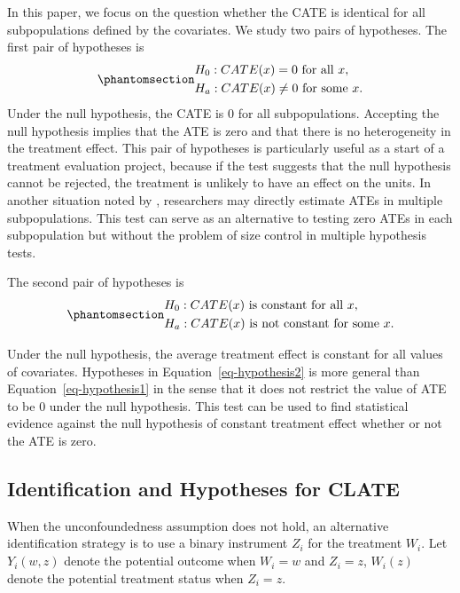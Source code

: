 \documentclass[
  12pt,
  12pt]{article}
\numberwithin{equation}{section}
\theoremstyle{definition}
\theoremstyle{plain}
\theoremstyle{plain}
\theoremstyle{remark}
\begin{document}
In this paper, we focus on the question whether the CATE is identical
for all subpopulations defined by the covariates. We study two pairs of
hypotheses. The first pair of hypotheses is
\begin{equation}\phantomsection\label{eq-hypothesis1}{
\begin{aligned}
& H_0: CATE(x) = 0 \ \text{for all} \ x, \\
& H_a: CATE(x) \neq 0 \ \text{for some} \ x.
\end{aligned}
}\end{equation} Under the null hypothesis, the CATE is 0 for all
subpopulations. Accepting the null hypothesis implies that the ATE is
zero and that there is no heterogeneity in the treatment effect. This
pair of hypotheses is particularly useful as a start of a treatment
evaluation project, because if the test suggests that the null
hypothesis cannot be rejected, the treatment is unlikely to have an
effect on the units. In another situation noted by
\citet{crump2008nonparametric}, researchers may directly estimate ATEs
in multiple subpopulations. This test can serve as an alternative to
testing zero ATEs in each subpopulation but without the problem of size
control in multiple hypothesis tests.

The second pair of hypotheses is
\begin{equation}\phantomsection\label{eq-hypothesis2}{
\begin{aligned}
& H_0: CATE(x) \ \text{is constant for all} \ x,  \\
& H_a: CATE(x) \ \text{is not constant for some} \ x.
\end{aligned}
}\end{equation}

Under the null hypothesis, the average treatment effect is constant for
all values of covariates. Hypotheses in Equation~\ref{eq-hypothesis2} is
more general than Equation~\ref{eq-hypothesis1} in the sense that it
does not restrict the value of ATE to be \(0\) under the null
hypothesis. This test can be used to find statistical evidence against
the null hypothesis of constant treatment effect whether or not the ATE
is zero.

\subsection{Identification and Hypotheses for CLATE}\label{sec-clate}

When the unconfoundedness assumption does not hold, an alternative
identification strategy is to use a binary instrument \(Z_i\) for the
treatment \(W_i\). Let \(Y_i(w, z)\) denote the potential outcome when
\(W_i = w\) and \(Z_i = z\), \(W_i(z)\) denote the potential treatment
status when \(Z_i = z\).
\end{document}
